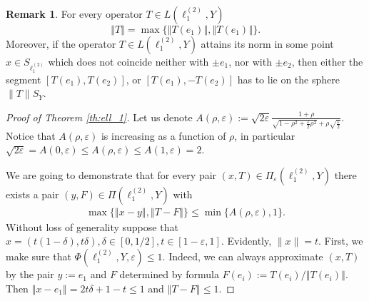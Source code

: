 \documentclass[11pt,a4paper]{amsart}
\newcommand{\eps}{\varepsilon}
\newcommand{\norm}[1]{\left\Vert#1\right\Vert}
\numberwithin{equation}{section}
\theoremstyle{plain}
\theoremstyle{definition}
\newtheorem{remark}[theorem]{Remark}
\renewcommand{\leq}{\leqslant}
\renewcommand{\geq}{\geqslant}
\begin{document}
\begin{remark}\label{rem_attain}
For every operator $T \in L(\ell_1^{(2)}, Y)$
$$\norm{T}=\max\{\norm{T(e_1)}, \norm{T(e_1)}\}.$$
Moreover, if the operator $T\in L(\ell_1^{(2)}, Y)$ attains its norm in some point $x\in S_{\ell_1^{(2)}}$
which does not coincide neither with $\pm e_1$, nor with $\pm e_2$, then either the segment $[T(e_1), T(e_2)]$, or $[T(e_1), - T(e_2)]$ has to lie on the sphere $\|T\|S_Y$. 
\end{remark}



\begin{proof}[Proof of Theorem \ref{th:ell_1}]
Let us denote $A(\rho, \eps):=\sqrt{2\varepsilon}\frac{1+\rho}{\sqrt{1-\rho^2+\frac{\eps}{2}\rho^2}+\rho\sqrt{\frac{\eps}{2}}}$. Notice that $A(\rho, \eps)$ is increasing as a function of $\rho$, in particular  $\sqrt{2\varepsilon}=A(0, \eps) \leq A(\rho, \eps) \leq A(1, \eps) = 2$.
 
% 
% 
% 
% 
% 
% 
% 
 
We are going to demonstrate that for every pair $(x, T)\in \Pi_\eps(\ell^{(2)}_1, Y)$ 
there exists a pair $(y, F)\in\Pi(\ell^{(2)}_1, Y)$ with
\begin{align*}
\max\{\norm{x-y}, \norm{T-F}\}\leq \min\{A(\rho, \eps), 1\}.
\end{align*}
Without loss of generality suppose that  $x=(t(1-\delta), t\delta), \delta\in [0, 1/2], t\in [1-\eps, 1]$. Evidently, $\|x\|=t$.  First, we make sure that $\Phi(\ell^{(2)}_1,Y,\varepsilon)\leq 1.$ Indeed, we can always approximate $(x, T)$ by the pair $y:=e_1$ and $F$ determined by formula $F(e_i):=T(e_i)/\norm{T(e_i)}$. Then $\norm{x-e_1}=2t\delta+1-t\leq 1$ and $\norm{T-F}\leq 1$.


\end{proof}
\end{document}
